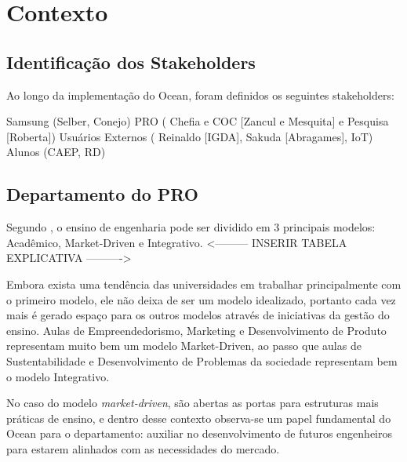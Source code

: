 \chapter{Contexto}
\label{cha:contexto}

\section{Identificação dos Stakeholders}
\label{sec:identificacao_stakeholders}

Ao longo da implementação do Ocean, foram definidos os seguintes stakeholders:

Samsung (Selber, Conejo)
PRO ( Chefia e COC [Zancul e Mesquita] e Pesquisa [Roberta])
Usuários Externos ( Reinaldo [IGDA], Sakuda [Abragames], IoT)
Alunos (CAEP, RD)


\section{Departamento do PRO}
\label{sec:dep_pro}

Segundo , o ensino de engenharia pode ser dividido em 3 principais modelos: Acadêmico, Market-Driven e Integrativo. <--------- INSERIR TABELA EXPLICATIVA ---------->

Embora exista uma tendência das universidades em trabalhar principalmente com o primeiro modelo, ele não deixa de ser um modelo idealizado, portanto cada vez mais é gerado espaço para os outros modelos através de iniciativas da gestão do ensino. Aulas de Empreendedorismo, Marketing e Desenvolvimento de Produto representam muito bem um modelo Market-Driven, ao passo que aulas de Sustentabilidade e Desenvolvimento de Problemas da sociedade representam bem o modelo Integrativo.

No caso do modelo \textit{market-driven}, são abertas as portas para estruturas mais práticas de ensino, e dentro desse contexto observa-se um papel fundamental do Ocean para o departamento: auxiliar no desenvolvimento de futuros engenheiros para estarem alinhados com as necessidades do mercado. 